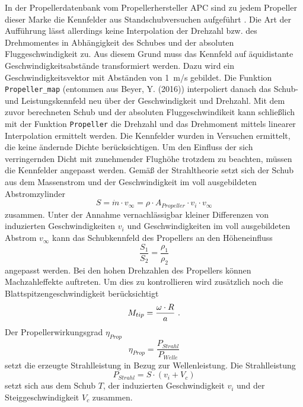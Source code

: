 In der Propellerdatenbank vom Propellerhersteller APC sind zu jedem Propeller dieser Marke die Kennfelder aus Standschubversuchen aufgeführt . Die Art der Aufführung lässt allerdings keine Interpolation der Drehzahl bzw. des Drehmomentes in Abhängigkeit des Schubes und der absoluten Fluggeschwindigkeit zu. Aus diesem Grund muss das Kennfeld auf äquidistante Geschwindigkeitsabstände transformiert werden. Dazu wird ein Geschwindigkeitsvektor mit Abständen von \SI{1}{m/s} gebildet. Die Funktion \texttt{Propeller\_map} (entommen aus Beyer, Y. (2016)) interpoliert danach das Schub- und Leistungskennfeld neu über der Geschwindigkeit und Drehzahl. Mit dem zuvor berechneten Schub und der absoluten Fluggeschwindikeit kann schließlich mit der Funktion \texttt{Propeller} die Drehzahl und das Drehmoment mittels linearer Interpolation ermittelt werden.
Die Kennfelder wurden in Versuchen ermittelt, die keine ändernde Dichte berücksichtigen. Um den Einfluss der sich verringernden Dicht mit zunehmender Flughöhe trotzdem zu beachten, müssen die Kennfelder angepasst werden. Gemäß der Strahltheorie setzt sich der Schub aus dem Massenstrom und der Geschwindigkeit im voll ausgebildeten Abstromzylinder 
\begin{equation}
	S =  \dot{m}\cdot v_{\infty} = \rho\cdot A_{Propeller}\cdot v_i\cdot v_{\infty}
\end{equation}
zusammen. Unter der Annahme vernachlässigbar kleiner Differenzen von  induzierten Geschwindigkeiten $v_i$ und Geschwindigkeiten im voll ausgebildeten Abstrom $v_{\infty}$ kann das Schubkennfeld des Propellers an den Höheneinfluss 
\begin{equation}
	\frac{S_1}{S_2} = \frac{\rho_1}{\rho_2}
\end{equation}
angepasst werden.
Bei den hohen Drehzahlen des Propellers können Machzahleffekte auftreten. Um dies zu kontrollieren wird zusätzlich noch die Blattspitzengeschwindigkeit berücksichtigt
\begin{equation}
	M_{tip} = \frac{\omega\cdot R}{a} ~\text{.}
\end{equation}
Der Propellerwirkungsgrad \ensuremath{\eta_{Prop}} 
\begin{equation}
	\eta_{Prop} = \frac{P_{Strahl}}{P_{Welle}}
\end{equation}
setzt die erzeugte Strahlleistung in Bezug zur Wellenleistung.
Die Strahlleistung 
\begin{equation}
	P_{Strahl} = S\cdot (v_i + V_c)
\end{equation}
setzt sich aus dem Schub \ensuremath{T}, der induzierten Geschwindigkeit \ensuremath{v_i} und der Steiggeschwindigkeit \ensuremath{V_c} zusammen. 


